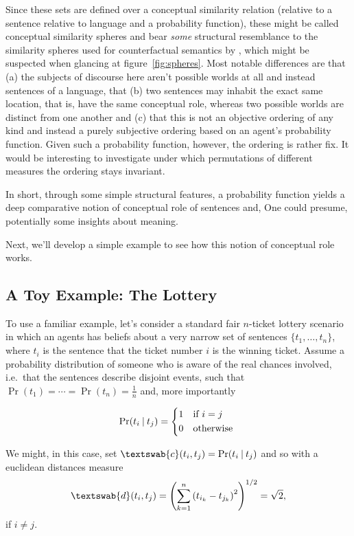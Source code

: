 \documentclass[11pt, a4paper]{scrartcl}
\renewcommand{\i}[1]{\emph{#1}}
\newcommand{\m}[1]{\textswab{#1}}
\newcommand{\given}[1][]{\:#1\vert\:}
\begin{document}
Since these sets are defined over a conceptual similarity relation (relative to a sentence relative to language and a probability function), these might be called conceptual similarity spheres and bear \i{some} structural resemblance to the similarity spheres used for counterfactual semantics by \textcite{Lewis1973-LEWC-2}, which might be suspected when glancing at figure~\ref{fig:spheres}. Most notable differences are that (a) the subjects of discourse here aren't possible worlds at all and instead sentences of a language, that (b) two sentences may inhabit the exact same location, that is, have the same conceptual role, whereas two possible worlds are distinct from one another and (c) that this is not an objective ordering of any kind and instead a purely subjective ordering based on an agent's probability function. Given such a probability function, however, the ordering is rather fix. It would be interesting to investigate under which permutations of different measures the ordering stays invariant.

In short, through some simple structural features, a probability function yields a deep comparative notion of conceptual role of sentences and, One could presume, potentially some insights about meaning.

Next, we'll develop a simple example to see how this notion of conceptual role works.

\subsection{A Toy Example: The Lottery}

To use a familiar example, let's consider a standard fair $n$-ticket lottery scenario in which an agents has beliefs about a very narrow set of sentences $\{ t_1, \dots, t_n\}$, where $t_i$ is the sentence that the ticket number $i$ is the winning ticket. Assume a probability distribution of someone who is aware of the real chances involved, i.e.\ that the sentences describe disjoint events, such that $\Pr(t_1) = \cdots = \Pr(t_n) = \frac{1}{n}$ and, more importantly

\[
    \Pr(t_i \given t_j)  =
    \begin{cases*}
        1 & if $i = j$ \\
        0        & otherwise
    \end{cases*}
\]

We might, in this case, set $\m{c}(t_i, t_j) = \Pr(t_i \given t_j)$ and so with a euclidean distances measure 
\[
    \m{d}(t_i,t_j) = {\left( \sum_{k=1}^n {(t_{i_k}-t_{j_k})}^2 \right)}^{1/2} = \sqrt{2},  
\]
if $i \not = j$.
\end{document}
